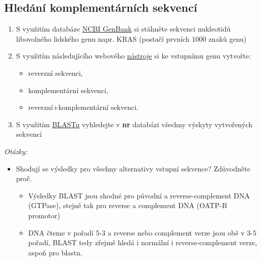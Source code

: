 \documentclass[11pt]{article}
\begin{document}
\subsection{Hledání komplementárních sekvencí}
\label{sec:orgefe9589}
\begin{enumerate}
\item S využitím databáze \href{http://www.ncbi.nlm.nih.gov/genbank/}{NCBI GenBank} si stáhněte sekvenci nukleotidů libovolného
lidského genu napr. KRAS (postačí prvních 1000 znaků genu)
\item S využitím následujícího webového \href{http://www.bioinformatics.org/sms/rev\_comp.html}{nástroje} si ke vstupnímu genu vytvořte:
\begin{itemize}
\item reverzní sekvenci,
\item komplementární sekvenci,
\item reverzní+komplementární sekvenci.
\end{itemize}

\item S využitím \href{http://blast.ncbi.nlm.nih.gov/Blast.cgi}{BLASTu} vyhledejte v \textbf{nr} databázi všechny výskyty vytvořených
sekvencí
\end{enumerate}

\emph{Otázky:}
\begin{itemize}
\item Shodují se výsledky pro všechny alternativy vstupní sekvence? Zdůvodněte proč.
\begin{itemize}
\item Výsledky BLAST jsou shodné pro původní a reverse-complement DNA (GTPase), stejně tak
pro reverse a complement DNA (OATP-B promotor)
\item DNA čteme v pořadí 5-3 a reverse nebo complement verze jsou obě v 3-5
pořadí, BLAST tedy zřejmě hledá i normální i reverse-complement verze, aspoň
pro blastn.
\end{itemize}
\end{itemize}
\end{document}
